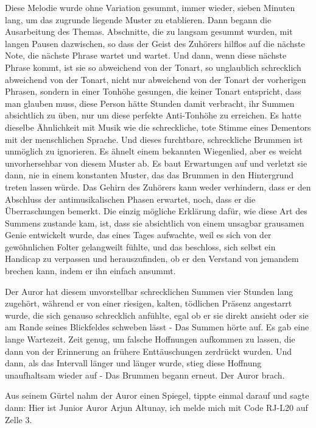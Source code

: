 Diese Melodie wurde ohne Variation gesummt, immer wieder, sieben Minuten lang,
um das zugrunde liegende Muster zu etablieren. Dann begann die Ausarbeitung des
Themas. Abschnitte, die zu langsam gesummt wurden, mit langen Pausen dazwischen,
so dass der Geist des Zuhörers hilflos auf die nächste Note, die nächste Phrase
wartet und wartet. Und dann, wenn diese nächste Phrase kommt, ist sie so
abweichend von der Tonart, so unglaublich schrecklich abweichend von der Tonart,
nicht nur abweichend von der Tonart der vorherigen Phrasen, sondern in einer
Tonhöhe gesungen, die keiner Tonart entspricht, dass man glauben muss, diese
Person hätte Stunden damit verbracht, ihr Summen absichtlich zu üben, nur um
diese perfekte Anti-Tonhöhe zu erreichen. Es hatte dieselbe Ähnlichkeit mit
Musik wie die schreckliche, tote Stimme eines Dementors mit der menschlichen
Sprache. Und dieses furchtbare, schreckliche Brummen ist unmöglich zu
ignorieren. Es ähnelt einem bekannten Wiegenlied, aber es weicht unvorhersehbar
von diesem Muster ab. Es baut Erwartungen auf und verletzt sie dann, nie in
einem konstanten Muster, das das Brummen in den Hintergrund treten lassen würde.
Das Gehirn des Zuhörers kann weder verhindern, dass er den Abschluss der
antimusikalischen Phasen erwartet, noch, dass er die Überraschungen bemerkt. Die
einzig mögliche Erklärung dafür, wie diese Art des Summens zustande kam, ist,
dass sie absichtlich von einem unsagbar grausamen Genie entwickelt wurde, das
eines Tages aufwachte, weil es sich von der gewöhnlichen Folter gelangweilt
fühlte, und das beschloss, sich selbst ein Handicap zu verpassen und
herauszufinden, ob er den Verstand von jemandem brechen kann, indem er ihn
einfach ansummt.

Der Auror hat diesem unvorstellbar schrecklichen Summen vier Stunden lang
zugehört, während er von einer riesigen, kalten, tödlichen Präsenz angestarrt
wurde, die sich genauso schrecklich anfühlte, egal ob er sie direkt ansieht oder
sie am Rande seines Blickfeldes schweben lässt - Das Summen hörte auf. Es gab
eine lange Wartezeit. Zeit genug, um falsche Hoffnungen aufkommen zu lassen, die
dann von der Erinnerung an frühere Enttäuschungen zerdrückt wurden. Und dann,
als das Intervall länger und länger wurde, stieg diese Hoffnung unaufhaltsam
wieder auf - Das Brummen begann erneut. Der Auror brach.

Aus seinem Gürtel nahm der Auror einen Spiegel, tippte einmal darauf und sagte
dann: \glqq Hier ist Junior Auror Arjun Altunay, ich melde mich mit Code RJ-L20
auf Zelle 3.\grqq{}

